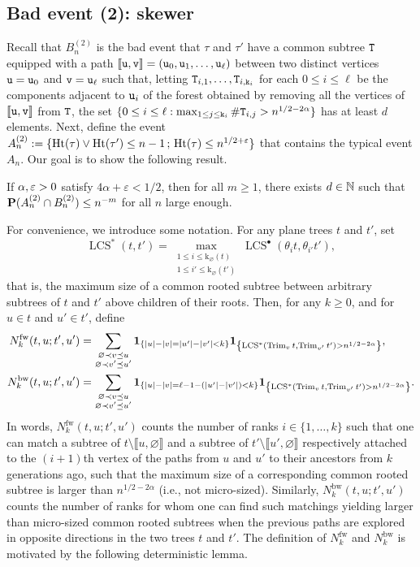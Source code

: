 \documentclass[11pt,reqno]{amsart}
\newcommand{\Ht}{\mathrm{Ht}}
\newcommand{\rk}{\mathrm{k}}
\newcommand{\Trim}{\operatorname{Trim}}
\newcommand{\LCS}{\operatorname{LCS}}
\newcommand{\fw}{\mathrm{fw}}
\newcommand{\bw}{\mathrm{bw}}
\begin{document}
\subsection{Bad event (2): skewer}

Recall that $B_n^{(2)}$ is the bad event that $\tau$ and $\tau'$ have a common subtree $\mathtt{T}$ equipped with a path $\llbracket \mathtt{u},\mathtt{v}\rrbracket=(\mathtt{u}_0,\mathtt{u}_1,\ldots,\mathtt{u}_\ell)$ between two distinct vertices $\mathtt{u}=\mathtt{u}_0$ and $\mathtt{v}=\mathtt{u}_\ell$ such that, letting $\mathtt{T}_{i,1},\ldots,\mathtt{T}_{i,\mathtt{k}_i}$ for each $0\leq i\leq \ell$ be the components adjacent to $\mathtt{u}_i$ of the forest obtained by removing all the vertices of $\llbracket \mathtt{u},\mathtt{v}\rrbracket$ from $\mathtt{T}$, the set $\{0\leq i\leq \ell : \max_{1\leq j\leq \mathtt{k}_i}\#\mathtt{T}_{i,j}>n^{1/2-2\alpha}\}$ has at least $d$ elements. Next, define the event $A_n^{(2)}:=\{\Ht(\tau) \vee \Ht(\tau') \leq n-1 \,;\, \Ht(\tau) \leq n^{1/2+\e}\}$ that contains the typical event $A_n$. Our goal is to show the following result.

\begin{prop}
\label{prop:no_skewers}
    If $\alpha, \varepsilon > 0$ satisfy $4\alpha+\varepsilon< 1/2$, then for all $m\geq 1$, there exists $d \in \mathbb{N}$ such that $\mathbf{P}(A_n^{(2)} \cap B_n^{(2)}) \leq n^{-m}$ for all $n$ large enough. 
\end{prop}

For convenience, we introduce some notation. For any plane trees $t$ and $t'$, set
\[\LCS^*(t,t')=\max_{\substack{1\leq i\leq \rk_\varnothing(t)\\ 1\leq i'\leq \rk_\varnothing(t')}}\LCS^\bullet(\theta_i t,\theta_{i'}t'),\]
that is, the maximum size of a common rooted subtree between arbitrary subtrees of $t$ and $t'$ above children of their roots. Then, for any $k\geq 0$, and for $u\in t$ and $u'\in t'$, define
\begin{align*}
N_{k}^{\fw}(t,u;t',u')&=\sum_{\substack{\varnothing\prec v\preceq u \\ \varnothing \prec v'\preceq u'}}\I{|u|-|v|=|u'|-|v'|<k} \I{\LCS^*(\Trim_v t,\Trim_{v'} t')>n^{1/2-2\alpha}},\\
N_{k}^{\bw}(t,u;t',u')&=\sum_{\substack{\varnothing\prec v\preceq u \\ \varnothing \prec v'\preceq u'}}\I{|u|-|v|=\ell-1-(|u'|-|v'|)<k} \I{\LCS^*(\Trim_v t,\Trim_{v'} t')>n^{1/2-2\alpha}}.
\end{align*}
In words, $N_k^{\fw}(t,u;t',u')$ counts the number of ranks $i\in\{1,\ldots,k\}$ such that one can match a subtree of $t\setminus \llbracket u,\varnothing\rrbracket$ and a subtree of $t'\setminus \llbracket u',\varnothing\rrbracket$ respectively attached to the $(i+1)$th vertex of the paths from $u$ and $u'$ to their ancestors from $k$ generations ago, such that the maximum size of a corresponding common rooted subtree is larger than $n^{1/2-2\alpha}$ (i.e., not micro-sized). Similarly, $N_k^{\bw}(t,u;t',u')$ counts the number of ranks for whom one can find such matchings yielding larger than micro-sized common rooted subtrees when the previous paths are explored in opposite directions in the two trees $t$ and $t'$. The definition of $N_k^{\fw}$ and $N_k^{\bw}$ is motivated by the following deterministic lemma.
\end{document}

